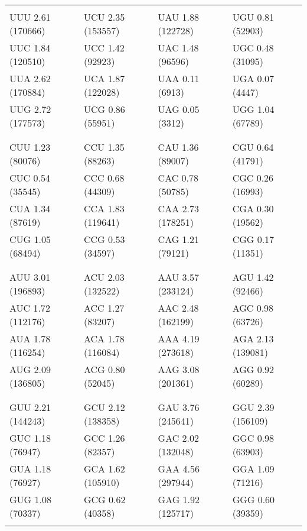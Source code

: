 \begin{center}
    \footnotesize
    \begin{tabu} to \textwidth{ | X[c] | X[c] | X[c] | X[c] | }
        \hline
        & & & \\
        UUU 2.61 (170666) & UCU 2.35 (153557) & UAU 1.88 (122728) & UGU 0.81  (52903) \\
        UUC 1.84 (120510) & UCC 1.42  (92923) & UAC 1.48  (96596) & UGC 0.48  (31095) \\
        UUA 2.62 (170884) & UCA 1.87 (122028) & UAA 0.11   (6913) & UGA 0.07   (4447) \\
        UUG 2.72 (177573) & UCG 0.86  (55951) & UAG 0.05   (3312) & UGG 1.04  (67789) \\
        & & & \\
        \hline
        & & & \\
        CUU 1.23  (80076) & CCU 1.35  (88263) & CAU 1.36  (89007) & CGU 0.64  (41791) \\
        CUC 0.54  (35545) & CCC 0.68  (44309) & CAC 0.78  (50785) & CGC 0.26  (16993) \\
        CUA 1.34  (87619) & CCA 1.83 (119641) & CAA 2.73 (178251) & CGA 0.30  (19562) \\
        CUG 1.05  (68494) & CCG 0.53  (34597) & CAG 1.21  (79121) & CGG 0.17  (11351) \\
        & & & \\
        \hline
        & & & \\
        AUU 3.01 (196893) & ACU 2.03 (132522) & AAU 3.57 (233124) & AGU 1.42  (92466) \\
        AUC 1.72 (112176) & ACC 1.27  (83207) & AAC 2.48 (162199) & AGC 0.98  (63726) \\
        AUA 1.78 (116254) & ACA 1.78 (116084) & AAA 4.19 (273618) & AGA 2.13 (139081) \\
        AUG 2.09 (136805) & ACG 0.80  (52045) & AAG 3.08 (201361) & AGG 0.92  (60289) \\
        & & & \\
        \hline
        & & & \\
        GUU 2.21 (144243) & GCU 2.12 (138358) & GAU 3.76 (245641) & GGU 2.39 (156109) \\
        GUC 1.18  (76947) & GCC 1.26  (82357) & GAC 2.02 (132048) & GGC 0.98  (63903) \\
        GUA 1.18  (76927) & GCA 1.62 (105910) & GAA 4.56 (297944) & GGA 1.09  (71216) \\
        GUG 1.08  (70337) & GCG 0.62  (40358) & GAG 1.92 (125717) & GGG 0.60  (39359) \\
        & & & \\
        \hline
    \end{tabu}
\end{center}

